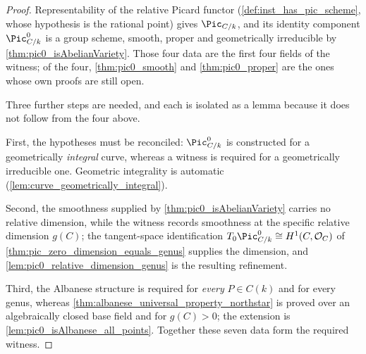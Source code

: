 \begin{proof}
  Representability of the relative Picard functor
  (\cref{def:inst_has_pic_scheme}, whose hypothesis is the rational point) gives
  \(\Pic_{C/k}\), and its identity component \(\Pic^0_{C/k}\) is a group scheme,
  smooth, proper and geometrically irreducible by
  \cref{thm:pic0_isAbelianVariety}. Those four data are the first four fields of
  the witness; of the four, \cref{thm:pic0_smooth} and \cref{thm:pic0_proper} are
  the ones whose own proofs are still open.

  Three further steps are needed, and each is isolated as a lemma because it does
  not follow from the four above.

  First, the hypotheses must be reconciled: \(\Pic^0_{C/k}\) is constructed for a
  geometrically \emph{integral} curve, whereas a witness is required for a
  geometrically irreducible one. Geometric integrality is automatic
  (\cref{lem:curve_geometrically_integral}).

  Second, the smoothness supplied by \cref{thm:pic0_isAbelianVariety} carries no
  relative dimension, while the witness records smoothness at the specific
  relative dimension \(g(C)\); the tangent-space identification
  \(T_0\Pic^0_{C/k}\cong H^1(C,\mathcal O_C)\) of
  \cref{thm:pic_zero_dimension_equals_genus} supplies the dimension, and
  \cref{lem:pic0_relative_dimension_genus} is the resulting refinement.

  Third, the Albanese structure is required for \emph{every} \(P\in C(k)\) and for
  every genus, whereas \cref{thm:albanese_universal_property_northstar} is proved
  over an algebraically closed base field and for \(g(C) > 0\); the extension is
  \cref{lem:pic0_isAlbanese_all_points}. Together these seven data form the
  required witness.
\end{proof}

